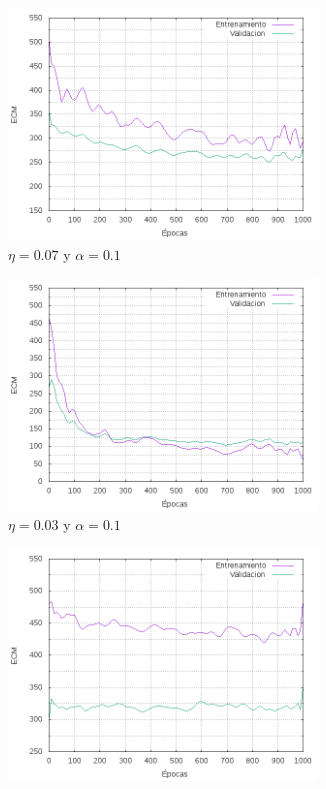 \begin{figure}
\centering
	\begin{subfigure}[b]{0.45\textwidth}
	  \includegraphics[width=0.9\textwidth]{imagenes/ej1/ex_2-1_red_11-6-6-9-1_errors.png}
	  \caption{$\eta = 0.07$ y $  \alpha = 0.1$}
	\end{subfigure}
	\begin{subfigure}[b]{0.45\textwidth}
	  \includegraphics[width=0.9\textwidth]{imagenes/ej1/ex_2-2_red_11-6-6-9-1_errors.png}
	  \caption{$\eta = 0.03 $ y $ \alpha = 0.1$}
	\end{subfigure}
	\begin{subfigure}[b]{0.45\textwidth}
	  \includegraphics[width=0.9\textwidth]{imagenes/ej1/ex_2-3_red_11-6-6-9-1_errors.png}

\end{subfigure}
\end{figure}

